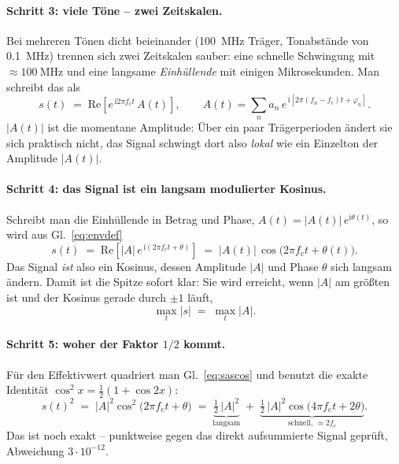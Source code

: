 \documentclass[11pt,a4paper]{article}
\begin{document}
\paragraph{Schritt 3: viele Töne -- zwei Zeitskalen.}
Bei mehreren Tönen dicht beieinander (\SI{100}{\mega\hertz} Träger,
Tonabstände von \SI{0.1}{\mega\hertz}) trennen sich zwei Zeitskalen sauber:
eine schnelle Schwingung mit $\approx\SI{100}{\mega\hertz}$ und eine langsame
\emph{Einhüllende} mit einigen Mikrosekunden. Man schreibt das als
\begin{equation}
  s(t) \;=\; \mathrm{Re}\!\left[e^{\,\mathrm{i}2\pi f_\mathrm{c}t}\,A(t)\right],
  \qquad
  A(t) = \sum_n a_n\, e^{\,\mathrm{i}\left[2\pi (f_n-f_\mathrm{c})t+\varphi_n\right]} .
  \label{eq:envdef}
\end{equation}
$|A(t)|$ ist die momentane Amplitude: Über ein paar Trägerperioden ändert sie
sich praktisch nicht, das Signal schwingt dort also \emph{lokal} wie ein
Einzelton der Amplitude $|A(t)|$.

\paragraph{Schritt 4: das Signal ist ein langsam modulierter Kosinus.}
Schreibt man die Einhüllende in Betrag und Phase, $A(t)=|A(t)|\,e^{\mathrm{i}\theta(t)}$,
so wird aus Gl.~\eqref{eq:envdef}
\begin{equation}
  s(t) \;=\; \mathrm{Re}\!\left[|A|\,e^{\,\mathrm{i}(2\pi f_\mathrm{c}t+\theta)}\right]
       \;=\; |A(t)|\,\cos\!\bigl(2\pi f_\mathrm{c}t+\theta(t)\bigr) .
  \label{eq:sascos}
\end{equation}
Das Signal \emph{ist} also ein Kosinus, dessen Amplitude $|A|$ und Phase
$\theta$ sich langsam ändern. Damit ist die Spitze sofort klar: Sie wird
erreicht, wenn $|A|$ am größten ist und der Kosinus gerade durch $\pm1$ läuft,
\begin{equation}
  \max_t|s| \;=\; \max_t|A| .
\end{equation}

\paragraph{Schritt 5: woher der Faktor \boldmath$1/2$ kommt.}
Für den Effektivwert quadriert man Gl.~\eqref{eq:sascos} und benutzt die
exakte Identität $\cos^2 x = \tfrac12\left(1+\cos 2x\right)$:
\begin{equation}
  s(t)^2 \;=\; |A|^2\cos^2\!\bigl(2\pi f_\mathrm{c}t+\theta\bigr)
  \;=\; \underbrace{\tfrac12\,|A|^2}_{\text{langsam}}
      \;+\; \underbrace{\tfrac12\,|A|^2\cos\!\bigl(4\pi f_\mathrm{c}t+2\theta\bigr)}_{\text{schnell, } \approx 2f_\mathrm{c}} .
  \label{eq:s2split}
\end{equation}
Das ist noch exakt -- punktweise gegen das direkt aufsummierte Signal
geprüft, Abweichung $3\cdot10^{-12}$.
\end{document}
